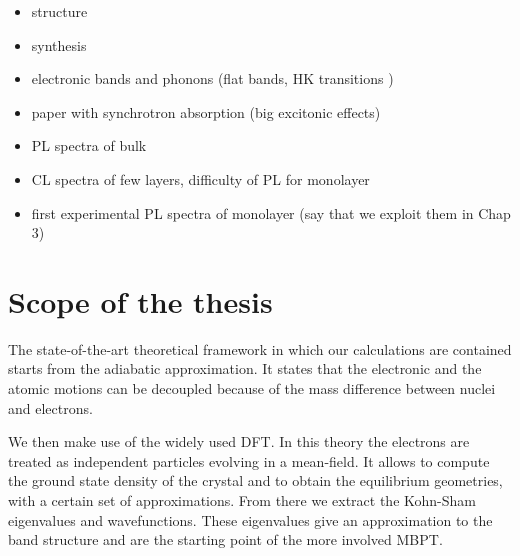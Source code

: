 \begin{itemize}
	\item structure
	\item synthesis
	\item electronic bands and phonons (flat bands, HK transitions \cite{fugallo}
  )
	\item paper with synchrotron absorption (big excitonic effects)
	\item PL spectra of bulk
	\item CL spectra of few layers, difficulty of PL for monolayer
	\item first experimental PL spectra of monolayer (say that we exploit them in Chap 3) 
\end{itemize}




\section{Scope of the thesis}
%
The state-of-the-art theoretical framework in which our calculations are contained starts from the adiabatic approximation.\cite{martin2020electronic} It states that the electronic and the atomic motions can be decoupled because of the mass difference between nuclei and electrons.

We then make use of the widely used \acrfull{DFT}.\cite{kohn1996density} In this theory the electrons are treated as independent particles evolving in a mean-field. It allows to compute the ground state density of the crystal and to obtain the equilibrium geometries, with a certain set of approximations. From there we extract the Kohn-Sham eigenvalues and wavefunctions. These eigenvalues give an approximation to the band structure and are the starting point of the more involved \acrfull{MBPT}. 

